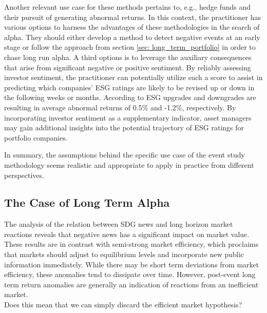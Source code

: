 Another relevant use case for these methods pertains to, e.g., hedge funds and their pursuit of generating abnormal returns. In this context, the practitioner has various options to harness the advantages of these methodologies in the search of alpha. They should either develop a method to detect negative events at an early stage or follow the approach from section \ref{sec: long_term_portfolio} in order to chase long run alpha. A third options is to leverage the auxiliary consequences that arise from significant negative or positive sentiment. By reliably assessing investor sentiment, the practitioner can potentially utilize such a score to assist in predicting which companies' ESG ratings are likely to be revised up or down in the following weeks or months. According to \cite{ESG_ratings_change} ESG upgrades and downgrades are resulting in average abnormal returns of 0.5\% and -1.2\%, respectively. By incorporating investor sentiment as a supplementary indicator, asset managers may gain additional insights into the potential trajectory of ESG ratings for portfolio companies.

In summary, the assumptions behind the specific use case of the event study methodology seems realistic and appropriate to apply in practice from different perspectives. 


\subsection{The Case of Long Term Alpha} \label{sec: discussion_alpha}

The analysis of the relation between SDG news and long horizon market reactions reveals that negative news has a significant impact on market value. These results are in contrast with semi-strong market efficiency, which proclaims that markets should adjust to equilibrium levels and incorporate new public information immediately. While there may be short term deviations from market efficiency, these anomalies tend to dissipate over time. However, post-event long term return anomalies are generally an indication of reactions from an inefficient market. \\
Does this mean that we can simply discard the efficient market hypothesis? 


